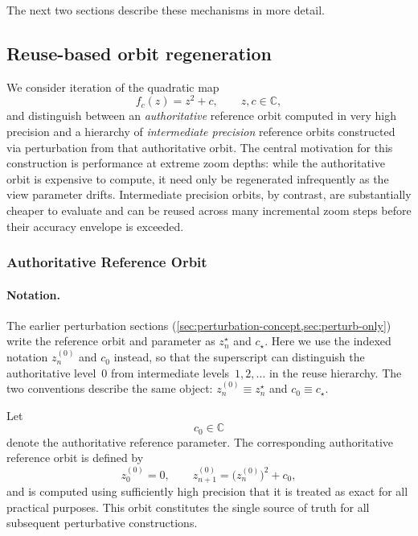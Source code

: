 The next two sections describe these mechanisms in more detail.

\subsection{Reuse-based orbit regeneration}
\label{subsec:ref-orbit-reuse}

We consider iteration of the quadratic map
\[
f_c(z) = z^2 + c,\qquad z,c \in \mathbb{C},
\]
and distinguish between an \emph{authoritative} reference orbit computed in very high precision and a hierarchy of
\emph{intermediate precision} reference orbits constructed via perturbation from that authoritative orbit.
The central motivation for this construction is performance at extreme zoom depths: while the authoritative orbit
is expensive to compute, it need only be regenerated infrequently as the view parameter drifts.
Intermediate precision orbits, by contrast, are substantially cheaper to evaluate and can be reused across many
incremental zoom steps before their accuracy envelope is exceeded.

\subsubsection{Authoritative Reference Orbit}

\paragraph{Notation.}
The earlier perturbation sections
(\cref{sec:perturbation-concept,sec:perturb-only})
write the reference orbit and parameter as
\(z_n^\star\) and \(c_\star\).
Here we use the indexed notation
\(z^{(0)}_n\) and \(c_0\) instead, so that the superscript can
distinguish the authoritative level~\(0\) from intermediate
levels~\(1,2,\ldots\) in the reuse hierarchy.
The two conventions describe the same object:
\(z^{(0)}_n \equiv z_n^\star\) and \(c_0 \equiv c_\star\).

Let
\[
c_0 \in \mathbb{C}
\]
denote the authoritative reference parameter.
The corresponding authoritative reference orbit is defined by
\begin{equation}
z^{(0)}_0 = 0, \qquad
z^{(0)}_{n+1} = \bigl(z^{(0)}_n\bigr)^2 + c_0,
\label{eq:authoritative_orbit}
\end{equation}
and is computed using sufficiently high precision that it is treated as exact for all practical purposes.
This orbit constitutes the single source of truth for all subsequent perturbative constructions.

